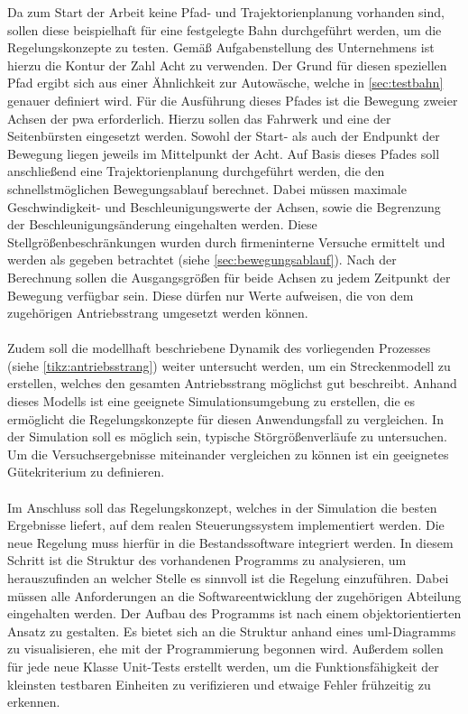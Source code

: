 Da zum Start der Arbeit keine Pfad- und Trajektorienplanung vorhanden sind, sollen diese beispielhaft für eine festgelegte Bahn durchgeführt werden, um die Regelungskonzepte zu testen. Gemäß Aufgabenstellung des Unternehmens ist hierzu die Kontur der Zahl Acht zu verwenden. Der Grund für diesen speziellen Pfad ergibt sich aus einer Ähnlichkeit zur Autowäsche, welche in \autoref{sec:testbahn} genauer definiert wird. Für die Ausführung dieses Pfades ist die Bewegung zweier Achsen der \ac{pwa} erforderlich. Hierzu sollen das Fahrwerk und eine der Seitenbürsten eingesetzt werden. Sowohl der Start- als auch der Endpunkt der Bewegung liegen jeweils im Mittelpunkt der Acht. Auf Basis dieses Pfades soll anschließend eine Trajektorienplanung durchgeführt werden, die den schnellstmöglichen Bewegungsablauf berechnet. Dabei müssen maximale Geschwindigkeit- und Beschleunigungswerte der Achsen, sowie die Begrenzung der Beschleunigungsänderung eingehalten werden. Diese Stellgrößenbeschränkungen wurden durch firmeninterne Versuche ermittelt und werden als gegeben betrachtet (siehe \autoref{sec:bewegungsablauf}). Nach der Berechnung sollen die Ausgangsgrößen für beide Achsen zu jedem Zeitpunkt der Bewegung verfügbar sein. Diese dürfen nur Werte aufweisen, die von dem zugehörigen Antriebsstrang umgesetzt werden können.\\
\\
Zudem soll die modellhaft beschriebene Dynamik des vorliegenden Prozesses (siehe \autoref{tikz:antriebsstrang}) weiter untersucht werden, um ein Streckenmodell zu erstellen, welches den gesamten Antriebsstrang möglichst gut beschreibt. Anhand dieses Modells ist eine geeignete Simulationsumgebung zu erstellen, die es ermöglicht die Regelungskonzepte für diesen Anwendungsfall zu vergleichen. In der Simulation soll es möglich sein, typische Störgrößenverläufe zu untersuchen. Um die Versuchsergebnisse miteinander vergleichen zu können ist ein geeignetes Gütekriterium zu definieren.\\
\\
Im Anschluss soll das Regelungskonzept, welches in der Simulation die besten Ergebnisse liefert, auf dem realen Steuerungssystem implementiert werden. Die neue Regelung muss hierfür in die Bestandssoftware integriert werden. In diesem Schritt ist die Struktur des vorhandenen Programms zu analysieren, um herauszufinden an welcher Stelle es sinnvoll ist die Regelung einzuführen. Dabei müssen alle Anforderungen an die Softwareentwicklung der zugehörigen Abteilung eingehalten werden. Der Aufbau des Programms ist nach einem objektorientierten Ansatz zu gestalten. Es bietet sich an die Struktur anhand eines \ac{uml}-Diagramms zu visualisieren, ehe mit der Programmierung begonnen wird. Außerdem sollen für jede neue Klasse Unit-Tests erstellt werden, um die Funktionsfähigkeit der kleinsten testbaren Einheiten zu verifizieren und etwaige Fehler frühzeitig zu erkennen.\\
